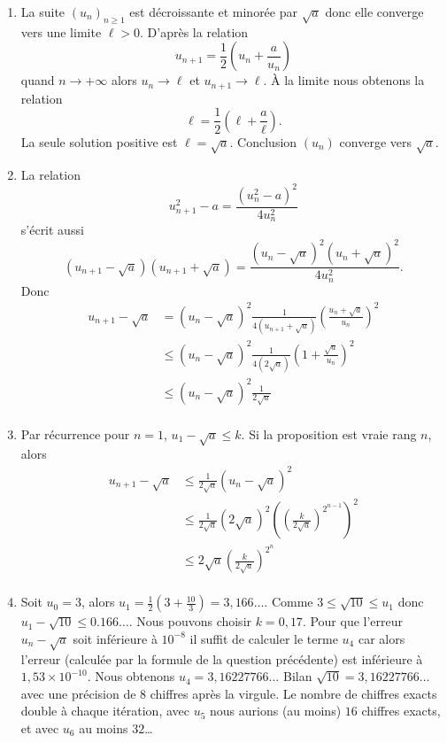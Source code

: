 \documentclass[11pt,a4paper]{article}
\renewcommand{\le}{\leqslant} \renewcommand{\leq}{\leqslant}
\begin{document}
\begin{enumerate}
Soit $n\geqslant 1$. Calculons le quotient de $u_{n+1}$ par $u_n$ :
$\frac{ u_{n+1}}{ u_n} = \frac12\left(1+\frac{a}{u_n^2}\right)$ or
$\frac{a}{u_n^2}\leqslant 1$ car $u_n \geqslant \sqrt a$. Donc $\frac{
u_{n+1}}{ u_n} \leqslant 1$ et donc $u_{n+1} \leqslant  u_n $. La suite
$(u_n)_{n\geqslant 1}$ est donc d\'ecroissante.
\item La suite $(u_n)_{n\geqslant 1}$ est d\'ecroissante et minor\'ee par $\sqrt a$ donc elle converge vers une limite $\ell>0$.
D'apr\`es la relation
$$u_{n+1} = \frac12\left(u_n+\frac{a}{u_n}\right)$$
quand $n\rightarrow + \infty$ alors $u_n \rightarrow \ell$ et
$u_{n+1} \rightarrow \ell$. \`A la limite nous obtenons la
relation
$$\ell = \frac12\left(\ell+\frac{a}{\ell}\right).$$
La seule solution positive est $\ell = \sqrt a$. Conclusion
$(u_n)$ converge vers $\sqrt a$.
\item La relation
$$ u_{n+1}^2-a =  \frac{(u_n^2-a)^2}{4u_n^2}$$
s'\'ecrit aussi
$$ (u_{n+1}-\sqrt a)(u_{n+1}+\sqrt a) = \frac{(u_n-\sqrt a)^2(u_n+\sqrt a)^2}{4u_n^2}.$$
Donc
\begin{align*}
       u_{n+1}-\sqrt a &= (u_n-\sqrt a)^2 \frac{1}{4(u_{n+1}+\sqrt a)}\left(\frac{u_n+\sqrt a}{u_n}\right)^2\\
                   &\leqslant (u_n-\sqrt a)^2 \frac{1}{4(2\sqrt a)}\left(1+\frac{\sqrt a}{u_n}\right)^2\\
                   &\leqslant (u_n-\sqrt a)^2  \frac{1}{2\sqrt a}\\
  \end{align*}
\item Par r\'ecurrence pour $n=1$, $u_1-\sqrt a \leqslant k$.
Si la proposition est vraie rang $n$, alors
\begin{align*}
       u_{n+1}-\sqrt a &\leqslant \frac{1}{2\sqrt a} (u_n-\sqrt a)^2  \\
       &\leqslant \frac{1}{2\sqrt a} (2\sqrt a)^2\left(\left( \frac{k}{2\sqrt a} \right)^{2^{n-1}} \right)^2\\
       &\leqslant 2\sqrt a \left( \frac{k}{2\sqrt a} \right)^{2^n}\\
\end{align*}
\item Soit $u_0=3$, alors $u_1 = \frac12(3+\frac{10}{3}) = 3,166\ldots$.
Comme $3\leqslant \sqrt{10} \leqslant u_1$ donc $u_1-\sqrt{10} \le
0.166\ldots$. Nous pouvons choisir $k=0,17$. Pour que l'erreur
$u_n-\sqrt a$ soit inf\'erieure \`a $10^{-8}$ il suffit de calculer le
terme $u_4$ car alors l'erreur (calcul\'ee par la formule de la
question pr\'ec\'edente) est inf\'erieure \`a $1,53\times 10^{-10}$. Nous
obtenons $u_4 = 3,16227766\ldots$
Bilan $\sqrt{10} =  3,16227766\ldots$ avec une précision de $8$ chiffres après la virgule. 
Le nombre de chiffres exacts double à chaque itération, avec $u_5$ nous aurions (au moins) $16$ chiffres exacts,
et avec $u_6$ au moins $32$\ldots
\end{enumerate}
\end{document}
